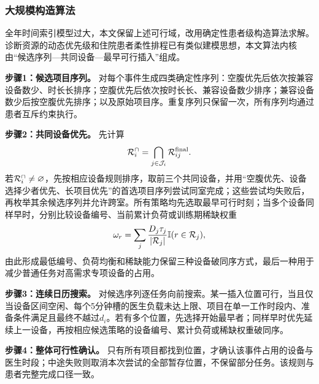 \subsubsection{大规模构造算法}

全年时间索引模型过大，本文保留上述可行域，改用确定性患者级构造算法求解。诊断资源的动态优先级和住院患者柔性排程已有类似建模思想\cite{patrick2008,patrick2007}，本文算法内核由“候选序列—共同设备—最早可行插入”组成。

\textbf{步骤1：候选项目序列。} 对每个事件生成四类确定性序列：空腹优先后依次按兼容设备数少、时长长排序；空腹优先后依次按时长长、兼容设备数少排序；兼容设备数少后按空腹优先排序；以及原始项目序。重复序列只保留一次，所有序列均通过患者互斥约束执行。

\textbf{步骤2：共同设备优先。} 先计算
\begin{equation}
\mathcal{R}_i^{\cap}=\bigcap_{j\in\mathcal{J}_i}\mathcal{R}_{ij}^{\mathrm{final}}.
\end{equation}
若$\mathcal{R}_i^{\cap}\ne\varnothing$，先按相应设备规则排序，取前三个共同设备，并用“空腹优先、设备选择少者优先、长项目优先”的首选项目序列尝试同室完成；这些尝试均失败后，再枚举其余候选序列并允许跨室。所有策略均先选取最早可行时刻；当多个设备同样早时，分别比较设备编号、当前累计负荷或训练期稀缺权重
\begin{equation}
\omega_r=\sum_j\frac{D_j\tau_j}{|\mathcal{R}_j|}\mathbb{I}(r\in\mathcal{R}_j),
\end{equation}
由此形成最低编号、负荷均衡和稀缺能力保留三种设备破同序方式，最后一种用于减少普通任务对高需求专项设备的占用。

\textbf{步骤3：连续日历搜索。} 对候选序列逐任务向前搜索。某一插入位置可行，当且仅当设备区间空闲、每个5分钟槽的医生负载未达上限、项目在单一工作时段内、准备条件满足且最终不越过$d_i$。若有多个位置，先选择开始最早者；同样早时优先延续上一设备，再按相应候选策略的设备编号、累计负荷或稀缺权重破同序。

\textbf{步骤4：整体可行性确认。} 只有所有项目都找到位置，才确认该事件占用的设备与医生时段；中途失败则取消本次尝试的全部暂存位置，不保留部分任务。该规则与患者完整完成口径一致。

